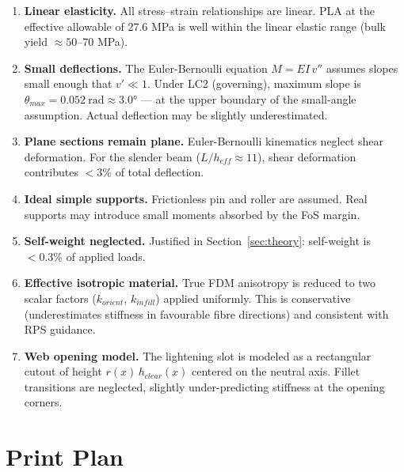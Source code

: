 \documentclass[11pt,letterpaper]{article}
\begin{document}
\begin{enumerate}
  \item \textbf{Linear elasticity.}
    All stress--strain relationships are linear.  PLA at the effective
    allowable of 27.6 MPa is well within the linear elastic range
    (bulk yield $\approx 50$--70 MPa).

  \item \textbf{Small deflections.}
    The Euler-Bernoulli equation $M = EI\,v''$ assumes slopes small enough
    that $v' \ll 1$.  Under LC2 (governing), maximum slope is
    $\theta_{max} = 0.052\ \mathrm{rad} \approx 3.0°$ --- at the upper
    boundary of the small-angle assumption.  Actual deflection may be
    slightly underestimated.

  \item \textbf{Plane sections remain plane.}
    Euler-Bernoulli kinematics neglect shear deformation.  For the slender
    beam ($L/h_{eff} \approx 11$), shear deformation contributes $< 3\%$
    of total deflection.

  \item \textbf{Ideal simple supports.}
    Frictionless pin and roller are assumed.  Real supports may introduce
    small moments absorbed by the FoS margin.

  \item \textbf{Self-weight neglected.}
    Justified in Section~\ref{sec:theory}: self-weight is $< 0.3\%$ of
    applied loads.

  \item \textbf{Effective isotropic material.}
    True FDM anisotropy is reduced to two scalar factors ($k_{orient}$,
    $k_{infill}$) applied uniformly.  This is conservative (underestimates
    stiffness in favourable fibre directions) and consistent with RPS guidance.

  \item \textbf{Web opening model.}
    The lightening slot is modeled as a rectangular cutout of height
    $r(x)\,h_{clear}(x)$ centered on the neutral axis.  Fillet transitions
    are neglected, slightly under-predicting stiffness at the opening corners.
\end{enumerate}


\section{Print Plan}
\label{sec:printplan}
\end{document}
